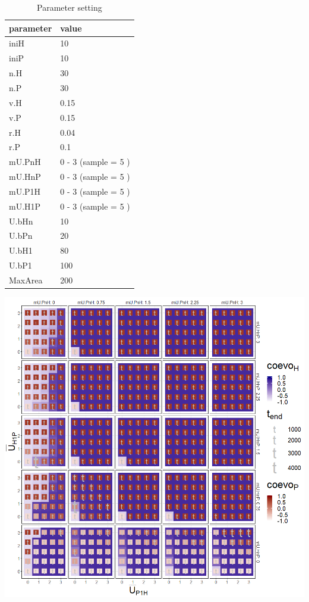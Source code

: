 \documentclass[]{book}
\begin{document}
\begin{table}[!h]

\caption{\label{tab:4mUHPmUPHtablepdf}Parameter setting}
\centering
\begin{tabular}{l|l}
\hline
parameter & value\\
\hline
iniH & 10\\
\hline
iniP & 10\\
\hline
n.H & 30\\
\hline
n.P & 30\\
\hline
v.H & 0.15\\
\hline
v.P & 0.15\\
\hline
r.H & 0.04\\
\hline
r.P & 0.1\\
\hline
mU.PnH & 0 - 3 (sample = 5 )\\
\hline
mU.HnP & 0 - 3 (sample = 5 )\\
\hline
mU.P1H & 0 - 3 (sample = 5 )\\
\hline
mU.H1P & 0 - 3 (sample = 5 )\\
\hline
U.bHn & 10\\
\hline
U.bPn & 20\\
\hline
U.bH1 & 80\\
\hline
U.bP1 & 100\\
\hline
MaxArea & 200\\
\hline
\end{tabular}
\end{table}

\newpage

\includegraphics[width=1\linewidth]{plots/4_fourPar-mU.HP-mU.PH_plot}
\end{document}
